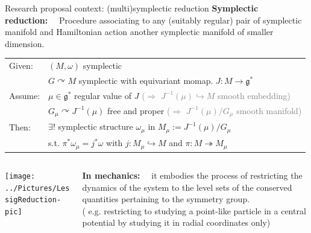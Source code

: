 \documentclass[10pt]{beamer}
\renewcommand{\action}{\curvearrowright}
\begin{document}
\begin{frame}{Research proposal context: (multi)symplectic reduction}
	\textbf{\color{UniGreen}Symplectic reduction:}~~
	Procedure associating to any (suitably regular) pair of symplectic manifold and Hamiltonian action another symplectic manifold of smaller dimension.
	\vfill
	\pause
	\begin{thmblock}
		\vspace{-.4em}
		\begin{tabular}{l p{12cm}}
		    Given: & $(M,\omega)$ symplectic
		    \\
		    & $G\curvearrowright M$ symplectic with equivariant momap. $J:M\to \mathfrak{g}^*$
		    \\[.2em]
		    Assume: & $\mu \in \mathfrak{g}^*$ regular value of $J$ 
		    \qquad\quad \footnotesize \textcolor{gray}{($\Rightarrow$ $J^{-1}(\mu)\hookrightarrow M$ smooth embedding)}
		    \\
			& $G_\mu\action J^{-1}(\mu)$ free and proper
			\quad \footnotesize \textcolor{gray}{($\Rightarrow$ $J^{-1}(\mu)/G_\mu$ smooth manifold)}
			\\[.4em]
			Then: & $\exists!$ symplectic structure $\omega_\mu$ in $M_\mu:= J^{-1}(\mu)/G_\mu$ \\
			& s.t. $\pi^\ast \omega_\mu = j^\ast \omega$ with $j:M_\mu \hookrightarrow M$ and $\pi:M\twoheadrightarrow M_\mu$
		\end{tabular}
		\vspace{-.4em}
	\end{thmblock}
	\vfill
	\pause
	\begin{columns}
		\begin{column}{0.40\textwidth}
			\texttt{[image: ../Pictures/LessigReduction-pic]}
		\end{column}	
		
		\begin{column}{0.6\textwidth}
				\textbf{\color{UniGreen}In mechanics:}~~
			it embodies the process of restricting the dynamics of the system to the level sets of the conserved quantities pertaining to the symmetry group.		
			\\
			\color{gray}\small( e.g. restricting to studying a point-like particle in a central potential by studying it in radial coordinates only)
		\end{column}	
	\end{columns}	


\end{frame}
\end{document}
